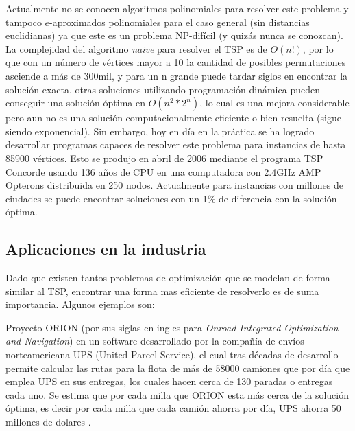 \documentclass[10pt,a4paper]{article}
\begin{document}
Actualmente no se conocen algoritmos polinomiales para resolver este problema y tampoco $e$-aproximados polinomiales para el caso general (sin distancias euclidianas) ya que este es un problema NP-difícil (y quizás nunca se conozcan). La complejidad del algoritmo \emph{naive} para resolver el TSP es de $O(n!)$, por lo que con un número de vértices mayor a 10 la cantidad de posibles permutaciones asciende a más de 300mil, y para un n grande puede tardar siglos en encontrar la solución exacta, otras soluciones utilizando programación dinámica pueden conseguir una solución óptima en $O(n^2*2^n)$, lo cual es una mejora considerable pero aun no es una solución computacionalmente eficiente o bien resuelta (sigue siendo exponencial). Sin embargo, hoy en día en la práctica se ha logrado desarrollar programas capaces de resolver este problema para instancias de hasta 85900 vértices. Esto se produjo en abril de 2006 mediante el programa TSP Concorde\cite{teo:concorde} usando 136 años de CPU en una computadora con 2.4GHz AMP Opterons distribuida en 250 nodos. Actualmente para instancias con millones de ciudades se puede encontrar soluciones con un 1\% de diferencia con la solución óptima.  

\subsection{Aplicaciones en la industria}

Dado que existen tantos problemas de optimización que se modelan de forma similar al TSP, encontrar una forma mas eficiente de resolverlo es de suma importancia. Algunos ejemplos son: \unboldmath

Proyecto ORION (por sus siglas en ingles para \emph{Onroad Integrated Optimization and Navigation}) en un software desarrollado por la compañía de envíos norteamericana UPS (United Parcel Service), el cual tras décadas de desarrollo permite calcular las rutas para la flota de más de 58000 camiones que por día que emplea UPS en sus entregas, los cuales hacen cerca de 130 paradas o entregas cada uno. Se estima que por cada milla que ORION esta más cerca de la solución óptima, es decir por cada milla que cada camión ahorra por día,  UPS ahorra 50 millones de dolares \cite{teo:ups}. 
\end{document}
